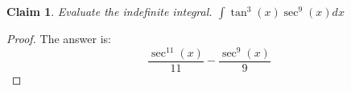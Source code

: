 \documentclass{article}
\newtheorem{theorem}{Claim}
\begin{document}
\begin{theorem}
Evaluate the indefinite integral. $\int \tan^{3}\!\left(x\right)\sec^{9}\!\left(x\right)   dx$
\end{theorem}

\begin{proof}
The answer is:
\[
\frac{\sec^{11}{\left(x \right)}}{11} - \frac{\sec^{9}{\left(x \right)}}{9}
\]
\end{proof}
\end{document}
